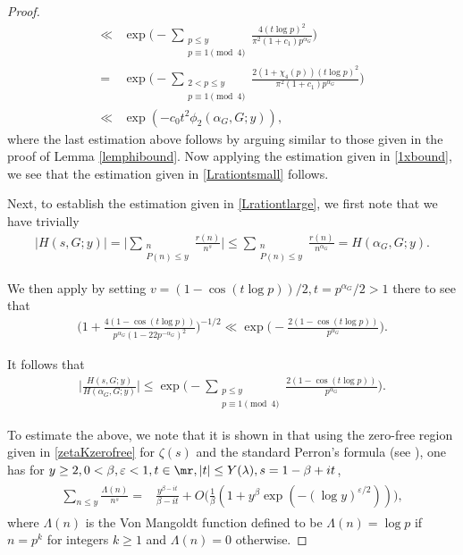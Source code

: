 \documentclass[twoside,leqno,10pt, A4]{amsart}
\begin{document}
\begin{proof}
\begin{align*}
  \ll &  \exp\Big (-\sum_{\substack{p \leq y \\ p \equiv 1 \pmod 4}}\frac {4(t \log p)^2}{\pi^2(1+c_1)p^{\alpha_G}} \Big ) \\
  =& \exp\Big (-\sum_{\substack{2<p \leq y \\ p \equiv 1 \pmod 4}}\frac {2(1+\chi_4(p))(t \log p)^2}{\pi^2(1+c_1)p^{\alpha_G}} \Big ) \\
   \ll & \exp (-c_0t^2\phi_2(\alpha_G,G;y)),
\end{align*}  
  where the last estimation above follows by arguing similar to those given in the proof of Lemma \ref{lemphibound}. 
Now applying the estimation given in \eqref{1xbound}, we see that the estimation given in \eqref{Lrationtsmall} follows. 
 
  Next, to establish the estimation given in \eqref{Lrationtlarge}, we first note that we have trivially
\begin{align}
\label{Hbound}
 |H(s,G;y)|=\Big|\sum_{\substack{n \\ P(n) \leq y}}\frac {r(n)}{n^s}\Big | \leq \sum_{\substack{n \\ P(n) \leq y}}\frac {r(n)}{n^{\alpha_G}} =H(\alpha_G,G;y). 
\end{align}  

  We then apply \cite[(3.14)]{HT86} by setting $v=(1-\cos (t\log p))/2, t=p^{\alpha_G}/2>1$ there to see that
\begin{align*}
 \Big (1+ \frac {4(1-\cos(t \log p))}{p^{\alpha_G}(1-22p^{-\alpha_G})^{2}} \Big )^{-1/2} \ll \exp \Big (  -\frac {2(1-\cos(t \log p))}{p^{\alpha_G}}\Big ). 
\end{align*}  

  It follows that
\begin{align}
\label{Lratiotlarge}
  \Big |\frac {H(s,G;y)}{ H(\alpha_G,G;y)} \Big | \leq \exp \Big (-\sum_{\substack{p \leq y \\ p \equiv 1 \pmod 4}} \frac {2(1-\cos(t \log p))}{p^{\alpha_G}} \Big ). 
\end{align}  

  To estimate the above, we note that it is shown in \cite[Lemma 6]{HT86} that using the zero-free region given in \eqref{zetaKzerofree} for $\zeta(s)$ and the standard Perron's formula (see \cite[Theorem 5.1]{MVa1}), one has for $y \geq 2, 0<\beta, \varepsilon<1, t \in \mr, |t| \leq Y(\lambda), s=1-\beta+it$,
\begin{align}
\label{Lambdapartialsum}
\begin{split}
  \sum_{n \leq y}\frac {\Lambda(n)}{n^s}
=& \frac {y^{\beta-it}}{\beta-it}+O\Big(\frac 1{\beta}(1+y^{\beta}\exp(-(\log y)^{\varepsilon/2}))\Big ),
\end{split}
\end{align}   
  where $\Lambda(n)$ is the Von Mangoldt function defined to be $\Lambda(n)=\log p$ if $n=p^k$ for integers $k \geq 1$ and $\Lambda(n)=0$ otherwise. 
  

\end{proof}
\end{document}
